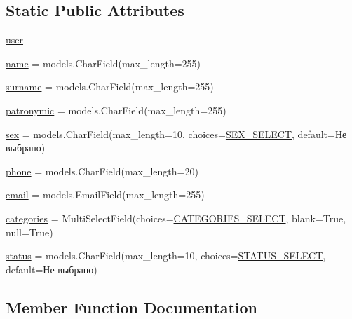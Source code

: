 \subsection*{Static Public Attributes}
\begin{DoxyCompactItemize}
\item 
\hyperlink{class_discount_1_1models_1_1_discount_user_a6b230ca6981d0134f176344cb1cc04f6}{user}
\item 
\hyperlink{class_discount_1_1models_1_1_discount_user_aabe7e4affd02880bed297a52849b5aba}{name} = models.\+Char\+Field(max\+\_\+length=255)
\item 
\hyperlink{class_discount_1_1models_1_1_discount_user_aad16e2ded4c7d241cafb2f3962797999}{surname} = models.\+Char\+Field(max\+\_\+length=255)
\item 
\hyperlink{class_discount_1_1models_1_1_discount_user_ab44a853a1aab2b0919bbd0fd30114745}{patronymic} = models.\+Char\+Field(max\+\_\+length=255)
\item 
\hyperlink{class_discount_1_1models_1_1_discount_user_a06393381cda95fb289abc50780ac7fcc}{sex} = models.\+Char\+Field(max\+\_\+length=10, choices=\hyperlink{namespace_discount_1_1models_a9696923b818a8cfb7e050ee4a8413053}{S\+E\+X\+\_\+\+S\+E\+L\+E\+CT}, default=\textquotesingle{}Не выбрано\textquotesingle{})
\item 
\hyperlink{class_discount_1_1models_1_1_discount_user_a8146b89f0a89fcb008c63fb1d486dbb5}{phone} = models.\+Char\+Field(max\+\_\+length=20)
\item 
\hyperlink{class_discount_1_1models_1_1_discount_user_a062411d99a353b7041f7384b9a0cf938}{email} = models.\+Email\+Field(max\+\_\+length=255)
\item 
\hyperlink{class_discount_1_1models_1_1_discount_user_ad890532e890b31722a1f83b387c36b4c}{categories} = Multi\+Select\+Field(choices=\hyperlink{namespace_discount_1_1models_a125399ca6dffacd93430a3418d3f39bb}{C\+A\+T\+E\+G\+O\+R\+I\+E\+S\+\_\+\+S\+E\+L\+E\+CT}, blank=True, null=True)
\item 
\hyperlink{class_discount_1_1models_1_1_discount_user_a96937e27e784452c9cd8d9cf5f63305f}{status} = models.\+Char\+Field(max\+\_\+length=10, choices=\hyperlink{namespace_discount_1_1models_a8d71c5509c24914255117f46069cb170}{S\+T\+A\+T\+U\+S\+\_\+\+S\+E\+L\+E\+CT}, default=\textquotesingle{}Не выбрано\textquotesingle{})
\end{DoxyCompactItemize}


\subsection{Member Function Documentation}
\mbox{\label{class_discount_1_1models_1_1_discount_user_a9dc158c8d924067598f48cae3c9016c0}} 
